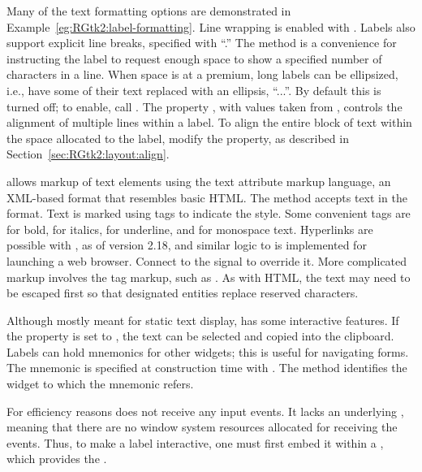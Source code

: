 Many of the text formatting options are demonstrated in
Example~\ref{eg:RGtk2:label-formatting}. Line wrapping is enabled with
. Labels also support explicit line
breaks, specified with ``\code{\backslashn}.'' The
 method is a convenience for instructing the
label to request enough space to show a specified number of
characters in a line.  When space is at a premium, long labels can be
ellipsized, i.e., have some of their text replaced with an
ellipsis, ``...''.  By default this is turned off; to enable, call
.  The property , with
values taken from , controls the alignment of
multiple lines within a label. To align the entire block of text
within the space allocated to the label, modify the 
property, as described in Section~\ref{sec:RGtk2:layout:align}.

\GTK\/ allows markup of text elements using the  text attribute
markup language, an XML-based format that resembles basic HTML. The
method  accepts text in the format. Text
is marked using tags to indicate the style. Some convenient tags are
 for bold,  for italics,  for
underline, and  for monospace text. Hyperlinks are possible
with , as of version 2.18, and similar logic to
 is implemented for launching a web
browser. Connect to the  signal to
override it. More complicated markup involves the  tag
markup, such as . As with
HTML, the text may need to be escaped first so that designated
entities replace reserved characters.

Although mostly meant for static text display,  has
some interactive features. If the  property is set to
, the text can be selected and copied into the clipboard.
Labels can hold mnemonics for other widgets; this is useful for
navigating forms. The mnemonic is specified at construction time with
. The
 method identifies the widget to
which the mnemonic refers.

For efficiency reasons  does not receive any input
events. It lacks an underlying , meaning that there
are no window system resources allocated for receiving the
events. Thus, to make a label interactive, one must first embed it
within a , which provides the .

